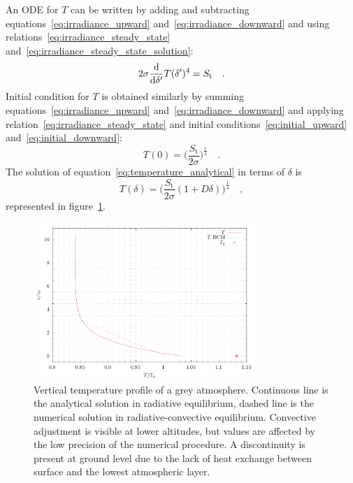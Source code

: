 \documentclass[a4paper,10pt,twocolumn,\classoptions]{article}
\begin{document}
An ODE for $T$ can be written by adding and subtracting equations~\eqref{eq:irradiance_upward} and~\eqref{eq:irradiance_downward} and using relations~\eqref{eq:irradiance_steady_state} and~\eqref{eq:irradiance_steady_state_solution}:
\begin{equation}
  \label{eq:temperature_analytical}
  2 \sigma \odv*{T(\delta')^4}{\delta'} = S_\text{t}
  \quad .
\end{equation}
Initial condition for $T$ is obtained similarly by summing equations~\eqref{eq:irradiance_upward} and~\eqref{eq:irradiance_downward} and applying relation~\eqref{eq:irradiance_steady_state} and initial conditions~\eqref{eq:initial_upward} and~\eqref{eq:initial_downward}:
\begin{equation}
  \label{eq:initial_temperature}
  T(0) = \bigg( \frac{S_\text{t}}{2 \sigma} \bigg)^\frac{1}{4}
  \quad .
\end{equation}
The solution of equation~\eqref{eq:temperature_analytical} in terms of $\delta$ is
\begin{equation}
  \label{eq:temperature_analytical_solution}
  T(\delta) = \bigg( \frac{S_\text{t}}{2 \sigma} (1 + D \delta) \bigg)^\frac{1}{4}
  \quad ,
\end{equation}
represented in figure~\ref{fig:temperature}.
\begin{figure}[h]
  \centering
  \includegraphics*[keepaspectratio=true,width=0.75\textwidth]{temperature}
  \caption{Vertical temperature profile of a grey atmosphere. Continuous line is the analytical solution in radiative equilibrium, dashed line is the numerical solution in radiative-convective equilibrium. Convective adjustment is visible at lower altitudes, but values are affected by the low precision of the numerical procedure. A discontinuity is present at ground level due to the lack of heat exchange between surface and the lowest atmospheric layer.}
  \label{fig:temperature}
\end{figure}
\end{document}
